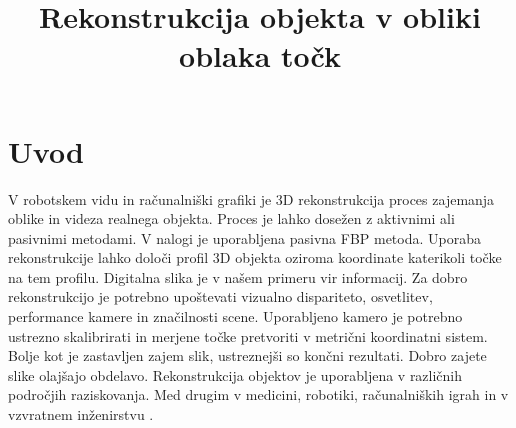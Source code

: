 \documentclass[journal,a4paper,twoside]{sty/IEEEtran}
\begin{document}
\title{Rekonstrukcija objekta v obliki oblaka točk}


\address{Univerza v Ljubljani, Fakulteta za elektrotehniko, Tržaška 25, 1000 Ljubljana, Slovenija\\
E-pošta: janez.lapajne@gmail.com, knap.martin@gmail.com}






\maketitle


\section{Uvod}
V robotskem vidu in računalniški grafiki je 3D rekonstrukcija proces zajemanja oblike in videza realnega objekta. Proces je lahko dosežen z aktivnimi ali pasivnimi metodami. V nalogi je uporabljena pasivna FBP metoda. Uporaba rekonstrukcije lahko določi profil 3D objekta oziroma koordinate katerikoli točke na tem profilu. Digitalna slika je v našem primeru vir informacij. Za dobro rekonstrukcijo je potrebno upoštevati vizualno dispariteto, osvetlitev, performance kamere in značilnosti scene. Uporabljeno kamero je potrebno ustrezno skalibrirati in merjene točke pretvoriti v metrični koordinatni sistem. Bolje kot je zastavljen zajem slik, ustreznejši so končni rezultati. Dobro zajete slike olajšajo obdelavo. Rekonstrukcija objektov je uporabljena v različnih področjih raziskovanja. Med drugim v medicini, robotiki, računalniških igrah in v vzvratnem inženirstvu \cite{vir1,vir2, vir3}. 
\end{document}
